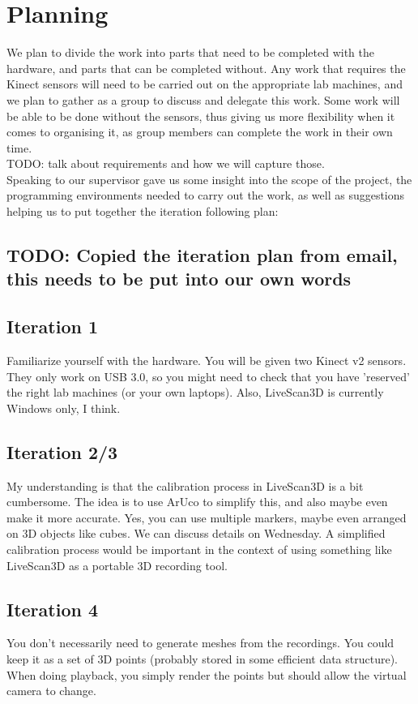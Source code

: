 \documentclass[a4paper,12pt]{article}
\begin{document}
\section*{Planning}
We plan to divide the work into parts that need to be completed with the hardware, and parts that can be completed without. Any work that requires the Kinect sensors will need to be carried out on the appropriate lab machines, and we plan to gather as a group to discuss and delegate this work. Some work will be able to be done without the sensors, thus giving us more flexibility when it comes to organising it, as group members can complete the work in their own time. \\
TODO: talk about requirements and how we will capture those. \\
Speaking to our supervisor gave us some insight into the scope of the project, the programming environments needed to carry out the work, as well as suggestions helping us to put together the iteration following plan:
\subsection*{TODO: Copied the iteration plan from email, this needs to be put into our own words}
\subsection*{Iteration 1}
Familiarize yourself with the hardware. You will be given two Kinect v2 sensors. They only work on USB 3.0, so you might need to check that you have 'reserved' the right lab machines (or your own laptops). Also, LiveScan3D is currently Windows only, I think.

\subsection*{Iteration 2/3}
My understanding is that the calibration process in LiveScan3D is a bit cumbersome. The idea is to use ArUco to simplify this, and also maybe even make it more accurate. Yes, you can use multiple markers, maybe even arranged on 3D objects like cubes. We can discuss details on Wednesday. A simplified calibration process would be important in the context of using something like LiveScan3D as a portable 3D recording tool.

\subsection*{Iteration 4}
You don't necessarily need to generate meshes from the recordings. You could keep it as a set of 3D points (probably stored in some efficient data structure). When doing playback, you simply render the points but should allow the virtual camera to change.
\end{document}
